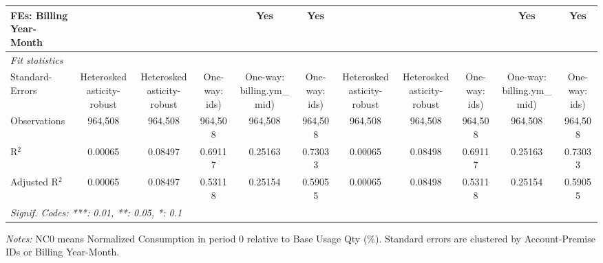 \begin{table}[htbp]
\begin{tabular}{lcccccccccc}
FEs: Billing Year-Month &  &  &  & Yes & Yes &  &  &  & Yes & Yes\\
\midrule
\emph{Fit statistics}&  & & & & & & & & & \\
Standard-Errors& Heteroskedasticity-robust&Heteroskedasticity-robust&One-way: ids)&One-way: billing.ym\_mid)&One-way: ids)&Heteroskedasticity-robust&Heteroskedasticity-robust&One-way: ids)&One-way: billing.ym\_mid)&One-way: ids)\\
Observations & 964,508&964,508&964,508&964,508&964,508&964,508&964,508&964,508&964,508&964,508\\
R$^2$ & 0.00065&0.08497&0.69117&0.25163&0.73033&0.00065&0.08498&0.69117&0.25163&0.73033\\
Adjusted R$^2$ & 0.00065&0.08497&0.53118&0.25154&0.59055&0.00065&0.08498&0.53118&0.25154&0.59055\\
\bottomrule\bottomrule
\multicolumn{11}{l}{\emph{Signif. Codes: ***: 0.01, **: 0.05, *: 0.1}}\\
\end{tabular}

\emph{\medskip Notes:} NC0 means Normalized Consumption in period 0 relative to Base Usage Qty (\%). Standard errors are clustered by Account-Premise IDs or Billing Year-Month.
\end{table}